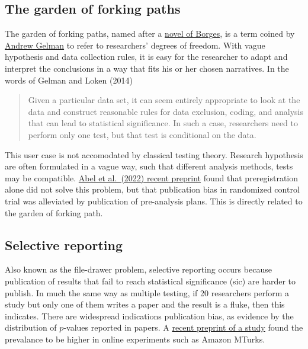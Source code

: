 \documentclass[
  11pt,
  letterpaper,
]{scrbook}
\theoremstyle{definition}
\theoremstyle{definition}
\theoremstyle{remark}
\begin{document}
\subsection{The garden of forking
paths}\label{the-garden-of-forking-paths}

The garden of forking paths, named after a
\href{https://en.wikipedia.org/wiki/The_Garden_of_Forking_Paths}{novel
of Borges}, is a term coined by
\href{http://www.stat.columbia.edu/~gelman/research/unpublished/forking.pdf}{Andrew
Gelman} to refer to researchers' degrees of freedom. With vague
hypothesis and data collection rules, it is easy for the researcher to
adapt and interpret the conclusions in a way that fits his or her chosen
narratives. In the words of Gelman and Loken (2014)

\begin{quote}
Given a particular data set, it can seem entirely appropriate to look at
the data and construct reasonable rules for data exclusion, coding, and
analysis that can lead to statistical significance. In such a case,
researchers need to perform only one test, but that test is conditional
on the data.
\end{quote}

This user case is not accomodated by classical testing theory. Research
hypothesis are often formulated in a vague way, such that different
analysis methods, tests may be compatible.
\href{https://docs.iza.org/dp15476.pdf}{Abel et al.~(2022) recent
preprint} found that preregistration alone did not solve this problem,
but that publication bias in randomized control trial was alleviated by
publication of pre-analysis plans. This is directly related to the
garden of forking path.

\subsection{Selective reporting}\label{selective-reporting}

Also known as the file-drawer problem, selective reporting occurs
because publication of results that fail to reach statistical
significance (sic) are harder to publish. In much the same way as
multiple testing, if 20 researchers perform a study but only one of them
writes a paper and the result is a fluke, then this indicates. There are
widespread indications publication bias, as evidence by the distribution
of \(p\)-values reported in papers. A
\href{https://docs.iza.org/dp15478.pdf}{recent preprint of a study}
found the prevalance to be higher in online experiments such as Amazon
MTurks.
\end{document}
